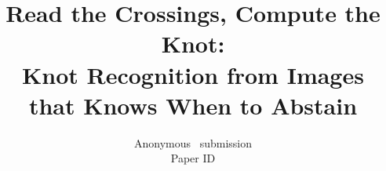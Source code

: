 \documentclass[10pt,twocolumn,letterpaper]{article}
\title{Read the Crossings, Compute the Knot:\\Knot Recognition from Images that Knows When to Abstain}
\author{Anonymous \confName~submission\\Paper ID \paperID}
\begin{document}
\maketitle



{\small

}

\end{document}
